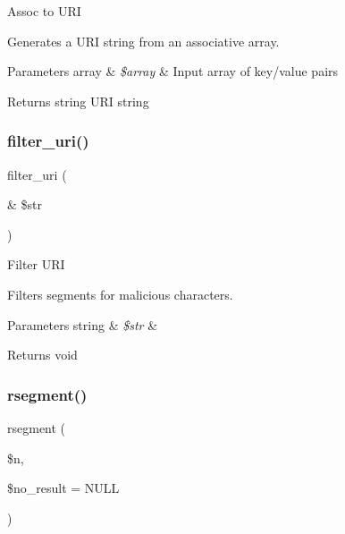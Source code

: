 Assoc to U\+RI

Generates a U\+RI string from an associative array.


\begin{DoxyParams}[1]{Parameters}
array & {\em \$array} & Input array of key/value pairs \\
\hline
\end{DoxyParams}
\begin{DoxyReturn}{Returns}
string U\+RI string 
\end{DoxyReturn}
\mbox{\label{class_c_i___u_r_i_a0449aea4e186717ecbf1eacfc59fc5b6}} 
\subsubsection{\texorpdfstring{filter\+\_\+uri()}{filter\_uri()}}
{\footnotesize\ttfamily filter\+\_\+uri (\begin{DoxyParamCaption}\item[{\&}]{\$str }\end{DoxyParamCaption})}

Filter U\+RI

Filters segments for malicious characters.


\begin{DoxyParams}[1]{Parameters}
string & {\em \$str} & \\
\hline
\end{DoxyParams}
\begin{DoxyReturn}{Returns}
void 
\end{DoxyReturn}
\mbox{\label{class_c_i___u_r_i_a0fbd875ee8f8965b0b495b1dce0080fb}} 
\subsubsection{\texorpdfstring{rsegment()}{rsegment()}}
{\footnotesize\ttfamily rsegment (\begin{DoxyParamCaption}\item[{}]{\$n,  }\item[{}]{\$no\+\_\+result = {\ttfamily NULL} }\end{DoxyParamCaption})}

